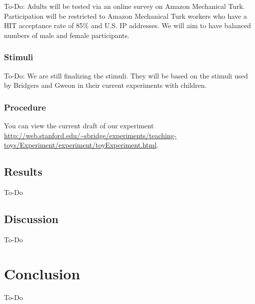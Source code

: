 \documentclass[10pt,letterpaper]{article}
\begin{document}
To-Do: Adults will be tested via an online survey on Amazon Mechanical Turk. Participation will be restricted to Amazon Mechanical Turk workers who have a HIT acceptance rate of 85\% and U.S. IP addresses. We will aim to have balanced numbers of male and female participants.

\subsubsection{Stimuli}

To-Do: We are still finalizing the stimuli. They will be based on the stimuli used by Bridgers and Gweon in their current experiments with children.

\subsubsection{Procedure}

You can view the current draft of our experiment \url{http://web.stanford.edu/~sbridge/experiments/teaching-toys/Experiment/experiment/toyExperiment.html}.

\subsection{Results}

To-Do

\subsection{Discussion}

To-Do

\section{Conclusion}

To-Do



\setlength{\bibleftmargin}{.125in}
\setlength{\bibindent}{-\bibleftmargin}


\end{document}
